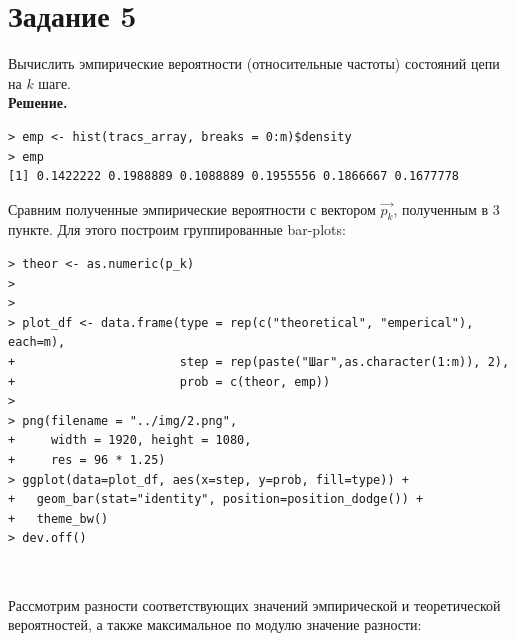 \documentclass[14pt,a4paper]{scrartcl}
\begin{document}
\section*{Задание 5}
Вычислить эмпирические вероятности (относительные частоты) состояний  цепи на $k$ шаге.\\
\textbf{Решение.}\\

\begin{verbatim}
> emp <- hist(tracs_array, breaks = 0:m)$density
> emp
[1] 0.1422222 0.1988889 0.1088889 0.1955556 0.1866667 0.1677778
\end{verbatim}

Сравним полученные эмпирические вероятности с вектором $\vec{p_k}$, полученным в 3 пункте. Для этого построим группированные bar-plots:

\begin{verbatim}
> theor <- as.numeric(p_k)
> 
> 
> plot_df <- data.frame(type = rep(c("theoretical", "emperical"), each=m),
+                       step = rep(paste("Шаг",as.character(1:m)), 2),
+                       prob = c(theor, emp))
> 
> png(filename = "../img/2.png",
+     width = 1920, height = 1080,
+     res = 96 * 1.25)
> ggplot(data=plot_df, aes(x=step, y=prob, fill=type)) +
+   geom_bar(stat="identity", position=position_dodge()) + 
+   theme_bw()
> dev.off()
\end{verbatim}

\begin{figure}[H]
	\begin{minipage}[h]{1\linewidth}
		  \\
	\end{minipage}
\end{figure}


Рассмотрим разности соответствующих значений эмпирической и теоретической вероятностей, а также максимальное по модулю значение разности:
\end{document}
